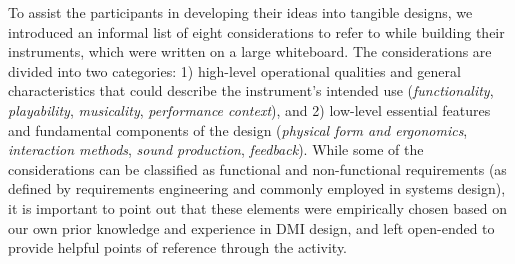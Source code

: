\documentclass[letterpaper, 12pt]{article}
\begin{document}


To assist the participants in developing their ideas into tangible designs, we introduced an informal list of eight considerations to refer to while building their instruments, which were written on a large whiteboard. The considerations are divided into two categories: 1) high-level operational qualities and general characteristics that could describe the instrument's intended use (\emph{functionality}, \emph{playability}, \emph{musicality}, \emph{performance context}), and 2) low-level essential features and fundamental components of the design (\emph{physical form and ergonomics}, \emph{interaction methods}, \emph{sound production}, \emph{feedback}).
While some of the considerations can be classified as functional and non-functional requirements (as defined by requirements engineering \citep{Glinz2007} and commonly employed in systems design), it is important to point out that these elements were empirically chosen based on our own prior knowledge and experience in DMI design, and left open-ended to provide helpful points of reference through the activity. 
\end{document}
